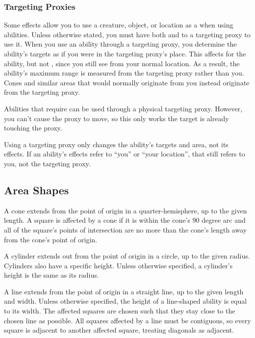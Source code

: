     \subsubsection{Targeting Proxies}\label{Targeting Proxies}
      Some effects allow you to use a creature, object, or location as a  when using abilities.
      Unless otherwise stated, you must have both  and  to a targeting proxy to use it.
      When you use an ability through a targeting proxy, you determine the ability's targets as if you were in the targeting proxy's place.
      This affects  for the ability, but not , since you still see from your normal location.
      As a result, the ability's maximum range is measured from the targeting proxy rather than you.
      Cones and similar areas that would normally originate from you instead originate from the targeting proxy.

      Abilities that require  can be used through a physical targeting proxy.
      However, you can't cause the proxy to move, so this only works the target is already touching the proxy.

      Using a targeting proxy only changes the ability's targets and area, not its effects.
      If an ability's effects refer to ``you'' or ``your location'', that still refers to you, not the targeting proxy.

  \subsection{Area Shapes}\label{Area Shapes}

     A cone extends from the point of origin in a quarter-hemisphere, up to the given length.
    A square is affected by a cone if it is within the cone's 90 degree arc and all of the square's points of intersection are no more than the cone's length away from the cone's point of origin.

     A cylinder extends out from the point of origin in a circle, up to the given radius.
    Cylinders also have a specific height.
    Unless otherwise specified, a cylinder's height is the same as its radius.

     A line extends from the point of origin in a straight line, up to the given length and width.
    Unless otherwise specified, the height of a line-shaped ability is equal to its width.
    The affected squares are chosen such that they stay close to the chosen line as possible.
    All squares affected by a line must be contiguous, so every square is adjacent to another affected square, treating diagonals as adjacent.

